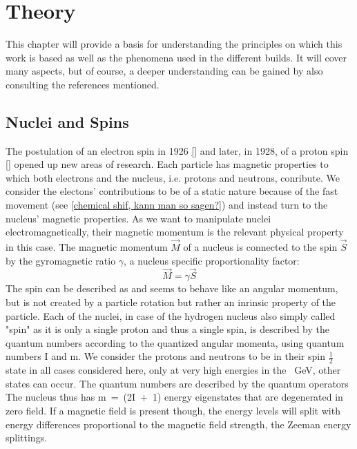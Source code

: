 \chapter{Theory}\label{chap:theory}
    This chapter will provide a basis for understanding the principles on which this work is based as well as the phenomena used in the different builds. It will cover many aspects, but of course, a deeper understanding can be gained by also consulting the references mentioned.
    \section{Nuclei and Spins}
        \label{theory:section:nucleiSpins}
        The postulation of an electron spin in 1926 \ref{} and later, in 1928, of a proton spin \ref{} opened
        up new areas of research.
        Each particle has magnetic properties to which both electrons and the nucleus, i.e. protons and neutrons, conribute. We consider the electons' contributions to be of a static nature because of the fast movement (see \ref{chemical shif, kann man so sagen?}) and instead turn to the nucleus' magnetic properties. As we want to manipulate nuclei electromagnetically, their magnetic momentum is the relevant physical property in this case.
        The magnetic momentum $\vec M$ of a nucleus is connected to the spin $\vec S$ by the gyromagnetic ratio $\gamma$, a nucleus specific proportionality factor:
        \begin{equation}
            \vec M = \gamma \vec S
            \label{eq:gyromagneticRatio}
        \end{equation}
        The spin can be described as and seems to behave like an angular momentum, but is not created by a particle rotation but rather an inrinsic property of the particle. Each of the nuclei, in case of the hydrogen nucleus also simply called "spin" as it is only a single proton and thus a single spin, is described by the quantum numbers according to the quantized angular momenta, using quantum numbers I and m. We consider the protons and neutrons to be in their spin $\tfrac{1}{2}$ state in all cases considered here, only at very high energies in the \SI{}{\giga\electronvolt}, other states can occur. The quantum numbers are described by the quantum operators   The nucleus thus has m~=~(2I~+~1) energy eigenstates that are degenerated in zero field. If a magnetic field is present though, the energy levels will split with energy differences proportional to the magnetic field strength, the Zeeman energy splittings.
